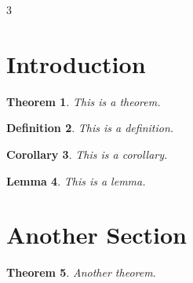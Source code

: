 3\documentclass{article}
\newtheorem{theorem}{Theorem}[section] %
\newtheorem{definition}[theorem]{Definition} %
\newtheorem{corollary}[theorem]{Corollary} %
\newtheorem{lemma}[theorem]{Lemma} %
\begin{document}
	
	\section{Introduction}
	
	\begin{theorem}
		This is a theorem.
	\end{theorem}
	
	\begin{definition}
		This is a definition.
	\end{definition}
	
	\begin{corollary}
		This is a corollary.
	\end{corollary}
	
	\begin{lemma}
		This is a lemma.
	\end{lemma}
	
	\section{Another Section}
	
	\begin{theorem}
		Another theorem.
	\end{theorem}
	
\end{document}
